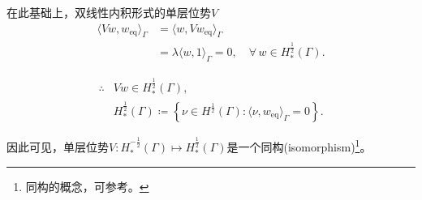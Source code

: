在此基础上，双线性内积形式的单层位势$V$
\begin{equation*}
\begin{split}
  \langle V w, w_{\text{eq}} \rangle_{\Gamma}
  & = \langle w, V w_{\text{eq}} \rangle_{\Gamma} \\
  & = \lambda \langle w, 1 \rangle_{\Gamma} = 0, \quad \forall \, w \in H_{*}^{\frac{1}{2}}(\Gamma).
\end{split}
\end{equation*}

\begin{equation*}
  \begin{split}
    \therefore & V w \in H_{*}^{\frac{1}{2}}(\Gamma), \\
    & H_{*}^{\frac{1}{2}}(\Gamma) \coloneqq
    \left\{
    \nu \in H^{\frac{1}{2}}(\Gamma): \langle \nu, w_{\text{eq}} \rangle_{\Gamma} = 0
    \right\}.
  \end{split}
\end{equation*}

因此可见，单层位势$V:H_{*}^{-\frac{1}{2}}(\Gamma) \mapsto H_{*}^{\frac{1}{2}}(\Gamma)$是一个同构(isomorphism)\footnote{同构的概念，可参考\cite[pp.34, Definition 3.11]{Muscat:2014cc}。}。
